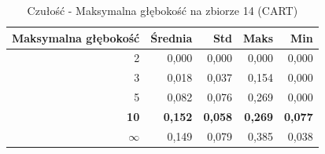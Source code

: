 \begin{table}[htbp]
\centering
\small
\setlength{\tabcolsep}{6pt}
\renewcommand{\arraystretch}{1.2}
\caption{Czułość - Maksymalna głębokość na zbiorze 14 (CART)}
\label{tab:CART_max_depth_14_recall}
\begin{tabular}{r|r|r|r|r}
\toprule
Maksymalna głębokość & Średnia & Std & Maks & Min \\
\hline
2 & 0,000 & 0,000 & 0,000 & 0,000 \\
3 & 0,018 & 0,037 & 0,154 & 0,000 \\
5 & 0,082 & 0,076 & 0,269 & 0,000 \\
\textbf{10} & \textbf{0,152} & \textbf{0,058} & \textbf{0,269} & \textbf{0,077} \\
$\infty$ & 0,149 & 0,079 & 0,385 & 0,038 \\
\bottomrule
\end{tabular}
\end{table}